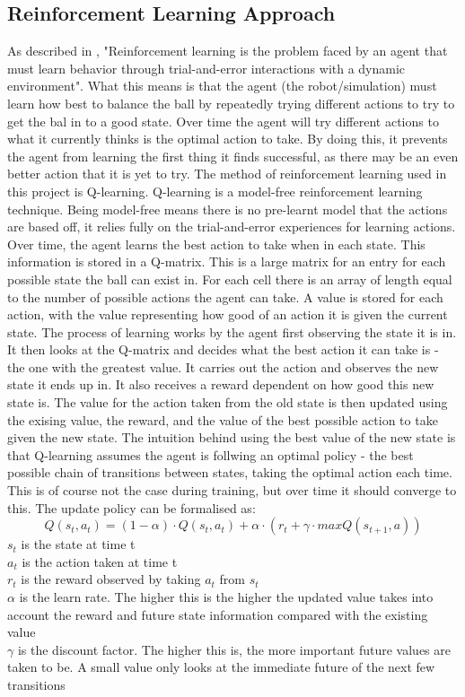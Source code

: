 \documentclass[12pt,a4paper]{article}
\begin{document}
\subsection{Reinforcement Learning Approach}
As described in \cite{rl_survey}, "Reinforcement learning is the problem faced by an agent that must learn behavior through trial-and-error interactions with a dynamic environment". What this means is that the agent (the robot/simulation) must learn how best to balance the ball by repeatedly trying different actions to try to get the bal in to a good state. Over time the agent will try different actions to what it currently thinks is the optimal action to take. By doing this, it prevents the agent from learning the first thing it finds successful, as there may be an even better action that it is yet to try. The method of reinforcement learning used in this project is Q-learning. Q-learning is a model-free reinforcement learning technique. Being model-free means there is no pre-learnt model that the actions are based off, it relies fully on the trial-and-error experiences for learning actions. Over time, the agent learns the best action to take when in each state. This information is stored in a Q-matrix. This is a large matrix for an entry for each possible state the ball can exist in. For each cell there is an array of length equal to the number of possible actions the agent can take. A value is stored for each action, with the value representing how good of an action it is given the current state. The process of learning works by the agent first observing the state it is in. It then looks at the Q-matrix and decides what the best action it can take is - the one with the greatest value. It carries out the action and observes the new state it ends up in. It also receives a reward dependent on how good this new state is. The value for the action taken from the old state is then updated using the exising value, the reward, and the value of the best possible action to take given the new state. The intuition behind using the best value of the new state is that Q-learning assumes the agent is follwing an optimal policy - the best possible chain of transitions between states, taking the optimal action each time. This is of course not the case during training, but over time it should converge to this. The update policy can be formalised as:
\[Q(s_t, a_t) = (1 - \alpha) \cdot Q(s_t, a_t) + \alpha\cdot(r_t + \gamma\cdot max Q(s_{t+1}, a)) \]
$s_t$ is the state at time t \\
$a_t$ is the action taken at time t \\
$r_t$ is the reward observed by taking $a_t$ from $s_t$\\
$\alpha$ is the learn rate. The higher this is the higher the updated value takes into account the reward and future state information compared with the existing value\\
$\gamma$ is the discount factor. The higher this is, the more important future values are taken to be. A small value only looks at the immediate future of the next few transitions\\
\end{document}
